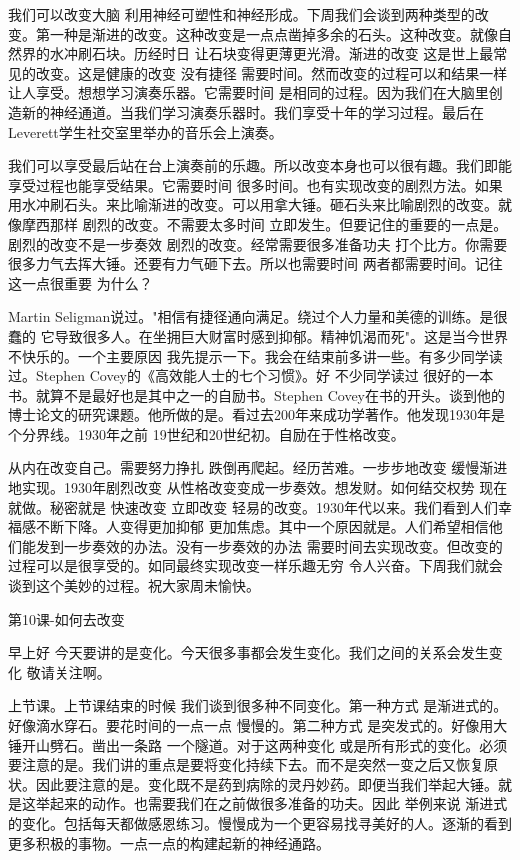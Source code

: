 我们可以改变大脑 利用神经可塑性和神经形成。下周我们会谈到两种类型的改变。第一种是渐进的改变。这种改变是一点点凿掉多余的石头。这种改变。就像自然界的水冲刷石块。历经时日 让石块变得更薄更光滑。渐进的改变 这是世上最常见的改变。这是健康的改变 没有捷径 需要时间。然而改变的过程可以和结果一样让人享受。想想学习演奏乐器。它需要时间 是相同的过程。因为我们在大脑里创造新的神经通道。当我们学习演奏乐器时。我们享受十年的学习过程。最后在Leverett学生社交室里举办的音乐会上演奏。 

我们可以享受最后站在台上演奏前的乐趣。所以改变本身也可以很有趣。我们即能享受过程也能享受结果。它需要时间 很多时间。也有实现改变的剧烈方法。如果用水冲刷石头。来比喻渐进的改变。可以用拿大锤。砸石头来比喻剧烈的改变。就像摩西那样 剧烈的改变。不需要太多时间 立即发生。但要记住的重要的一点是。剧烈的改变不是一步奏效 剧烈的改变。经常需要很多准备功夫 打个比方。你需要很多力气去挥大锤。还要有力气砸下去。所以也需要时间 两者都需要时间。记往这一点很重要 为什么？ 

Martin Seligman说过。"相信有捷径通向满足。绕过个人力量和美德的训练。是很蠢的 它导致很多人。在坐拥巨大财富时感到抑郁。精神饥渴而死"。这是当今世界不快乐的。一个主要原因 我先提示一下。我会在结束前多讲一些。有多少同学读过。Stephen Covey的《高效能人士的七个习惯》。好 不少同学读过 很好的一本书。就算不是最好也是其中之一的自励书。Stephen Covey在书的开头。谈到他的博士论文的研究课题。他所做的是。看过去200年来成功学著作。他发现1930年是个分界线。1930年之前 19世纪和20世纪初。自励在于性格改变。 

从内在改变自己。需要努力挣扎 跌倒再爬起。经历苦难。一步步地改变 缓慢渐进地实现。1930年剧烈改变 从性格改变变成一步奏效。想发财。如何结交权势 现在就做。秘密就是 快速改变 立即改变 轻易的改变。1930年代以来。我们看到人们幸福感不断下降。人变得更加抑郁 更加焦虑。其中一个原因就是。人们希望相信他们能发到一步奏效的办法。没有一步奏效的办法 需要时间去实现改变。但改变的过程可以是很享受的。如同最终实现改变一样乐趣无穷 令人兴奋。下周我们就会谈到这个美妙的过程。祝大家周未愉快。 

第10课-如何去改变 

早上好 今天要讲的是变化。今天很多事都会发生变化。我们之间的关系会发生变化 敬请关注啊。 

上节课。上节课结束的时候 我们谈到很多种不同变化。第一种方式 是渐进式的。好像滴水穿石。要花时间的一点一点 慢慢的。第二种方式 是突发式的。好像用大锤开山劈石。凿出一条路 一个隧道。对于这两种变化 或是所有形式的变化。必须要注意的是。我们讲的重点是要将变化持续下去。而不是突然一变之后又恢复原状。因此要注意的是。变化既不是药到病除的灵丹妙药。即便当我们举起大锤。就是这举起来的动作。也需要我们在之前做很多准备的功夫。因此 举例来说 渐进式的变化。包括每天都做感恩练习。慢慢成为一个更容易找寻美好的人。逐渐的看到更多积极的事物。一点一点的构建起新的神经通路。 

